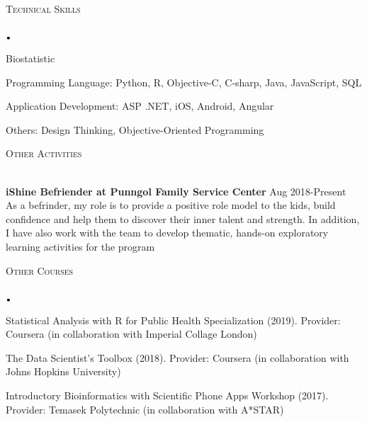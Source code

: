 \documentclass[11pt]{article}
\newcommand{\lineunder}{\vspace*{-8pt} \\ \hspace*{-18pt} \hrulefill \\}
\newcommand{\header}[1]{{\hspace*{-15pt}\vspace*{6pt} \textsc{#1}} \vspace*{-6pt} \lineunder}
\newcommand{\lbt}{\,\begin{picture}(-1,1)(-1,-3)\circle*{3}\end{picture}\ }
\newenvironment{achievements}{
    \begin{list}{$\lbt$}{
        \topsep 0pt
        \itemsep 0pt
        \addtolength{\leftmargin}{-0.1in}
    }
}
{
    \vspace*{4pt}
    \end{list}
}
\newcommand{\schoolwithcourses}[4]{
 \textbf{#1} \hfill{#2}\\
    #3\\
\vspace*{5pt}
}
\begin{document}
\header{Technical Skills}
\vspace{2mm}
\begin{achievements}
\justifying
\item Biostatistic
\item Programming Language: Python, R, Objective-C, C-sharp, Java, JavaScript, SQL
\item Application Development: ASP .NET, iOS, Android, Angular
\item Others: Design Thinking, Objective-Oriented Programming
\end{achievements}
\hfill{}

\header{Other Activities}
\vspace{2mm}
\schoolwithcourses{iShine Befriender at Punngol Family Service Center}{ Aug 2018-Present} 
{As a befrinder, my role is to provide a positive role model to the kids, build confidence and help them to discover their inner talent and strength. In addition, I have also work with the team to develop thematic, hands-on exploratory learning activities for the program}
\hfill{}
   
\header{Other Courses}
\vspace{2mm}
\begin{achievements}
\item Statistical Analysis with R for Public Health Specialization (2019). Provider: Coursera (in collaboration with Imperial Collage London)
\item The Data Scientist's Toolbox (2018). Provider: Coursera (in collaboration with Johns Hopkins University)
\item Introductory Bioinformatics with Scientific Phone Apps Workshop (2017). Provider: Temasek Polytechnic (in collaboration with A*STAR)
\end{achievements}
\hfill{}
\end{document}
